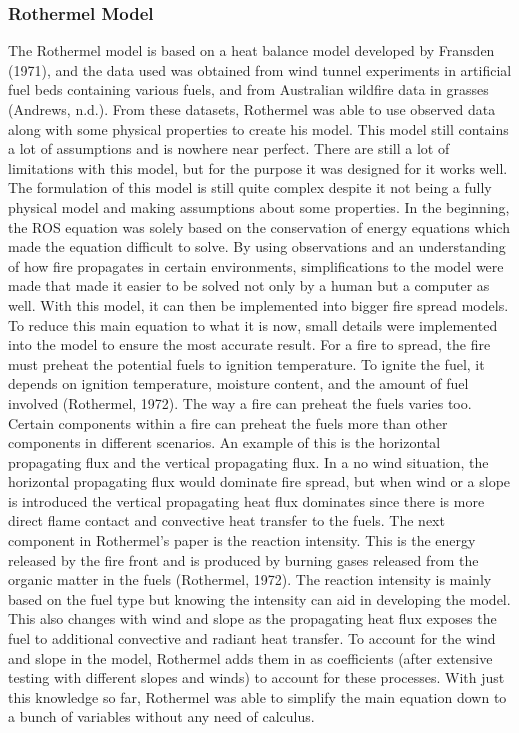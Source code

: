 \documentclass{article}
\begin{document}
\subsubsection{Rothermel Model}
\indent The Rothermel model is based on a heat balance model developed by Fransden (1971), and the data used was obtained from wind tunnel experiments in artificial fuel beds containing various fuels, and from Australian wildfire data in grasses (Andrews, n.d.). From these datasets, Rothermel was able to use observed data along with some physical properties to create his model. This model still contains a lot of assumptions and is nowhere near perfect. There are still a lot of limitations with this model, but for the purpose it was designed for it works well. \\
\indent The formulation of this model is still quite complex despite it not being a fully physical model and making assumptions about some properties. In the beginning, the ROS equation was solely based on the conservation of energy equations which made the equation difficult to solve. By using observations and an understanding of how fire propagates in certain environments, simplifications to the model were made that made it easier to be solved not only by a human but a computer as well. With this model, it can then be implemented into bigger fire spread models. \\
\indent To reduce this main equation to what it is now, small details were implemented into the model to ensure the most accurate result. For a fire to spread, the fire must preheat the potential fuels to ignition temperature. To ignite the fuel, it depends on ignition temperature, moisture content, and the amount of fuel involved (Rothermel, 1972). The way a fire can preheat the fuels varies too. Certain components within a fire can preheat the fuels more than other components in different scenarios. An example of this is the horizontal propagating flux and the vertical propagating flux. In a no wind situation, the horizontal propagating flux would dominate fire spread, but when wind or a slope is introduced the vertical propagating heat flux dominates since there is more direct flame contact and convective heat transfer to the fuels. The next component in Rothermel’s paper is the reaction intensity. This is the energy released by the fire front and is produced by burning gases released from the organic matter in the fuels (Rothermel, 1972). The reaction intensity is mainly based on the fuel type but knowing the intensity can aid in developing the model. This also changes with wind and slope as the propagating heat flux exposes the fuel to additional convective and radiant heat transfer. To account for the wind and slope in the model, Rothermel adds them in as coefficients (after extensive testing with different slopes and winds) to account for these processes. With just this knowledge so far, Rothermel was able to simplify the main equation down to a bunch of variables without any need of calculus.\\
\end{document}
